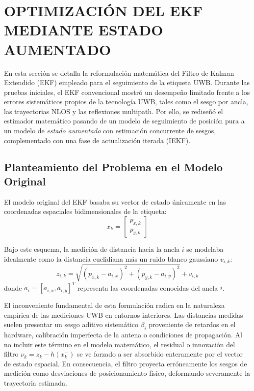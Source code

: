 \section{OPTIMIZACIÓN DEL EKF MEDIANTE ESTADO AUMENTADO}

En esta sección se detalla la reformulación matemática del Filtro de Kalman Extendido (EKF) empleado para el seguimiento de la etiqueta UWB. Durante las pruebas iniciales, el EKF convencional mostró un desempeño limitado frente a los errores sistemáticos propios de la tecnología UWB, tales como el sesgo por ancla, las trayectorias NLOS y las reflexiones multipath. Por ello, se rediseñó el estimador matemático pasando de un modelo de seguimiento de posición pura a un modelo de \textit{estado aumentado} con estimación concurrente de sesgos, complementado con una fase de actualización iterada (IEKF).

\subsection{Planteamiento del Problema en el Modelo Original}
El modelo original del EKF basaba su vector de estado únicamente en las coordenadas espaciales bidimensionales de la etiqueta:
\begin{equation}
    x_k = \begin{bmatrix} p_{x,k} \\ p_{y,k} \end{bmatrix}
\end{equation}

Bajo este esquema, la medición de distancia hacia la ancla $i$ se modelaba idealmente como la distancia euclidiana más un ruido blanco gaussiano $v_{i,k}$:
\begin{equation}
    z_{i,k} = \sqrt{(p_{x,k} - a_{i,x})^2 + (p_{y,k} - a_{i,y})^2} + v_{i,k}
\end{equation}
donde $a_i = [a_{i,x}, a_{i,y}]^T$ representa las coordenadas conocidas del ancla $i$.

El inconveniente fundamental de esta formulación radica en la naturaleza empírica de las mediciones UWB en entornos interiores. Las distancias medidas suelen presentar un sesgo aditivo sistemático $\beta_i$ proveniente de retardos en el hardware, calibración imperfecta de la antena o condiciones de propagación. Al no incluir este término en el modelo matemático, el residual o innovación del filtro $\nu_k = z_k - h(x_k^-)$ se ve forzado a ser absorbido enteramente por el vector de estado espacial. En consecuencia, el filtro proyecta erróneamente los sesgos de medición como desviaciones de posicionamiento físico, deformando severamente la trayectoria estimada.

